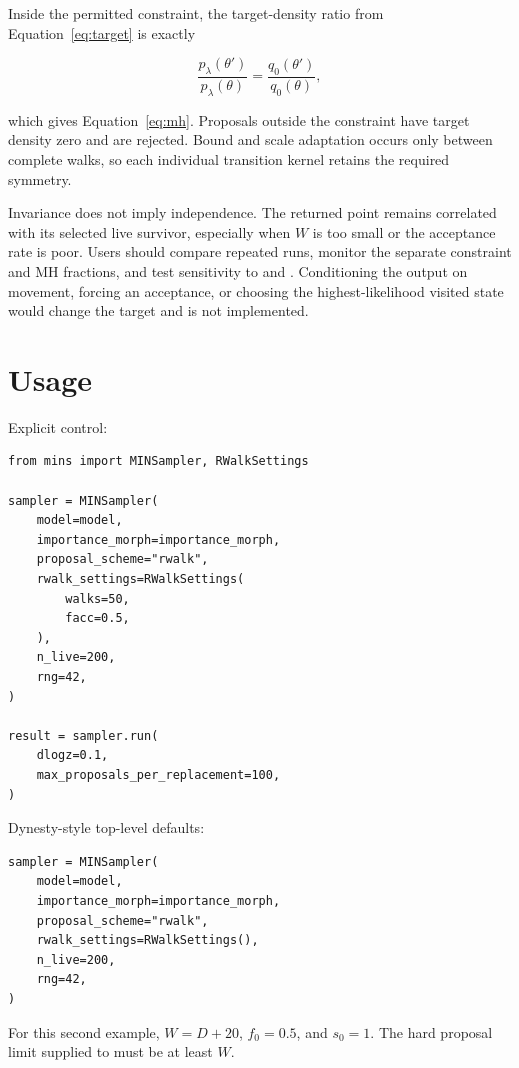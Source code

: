 \documentclass[11pt,a4paper]{article}
\newcommand{\code}[1]{\texttt{\detokenize{#1}}}
\begin{document}
Inside the permitted constraint, the target-density ratio from
Equation~\eqref{eq:target} is exactly

\begin{equation}
  \frac{p_\lambda(\theta')}{p_\lambda(\theta)}
  =\frac{q_0(\theta')}{q_0(\theta)},
\end{equation}

which gives Equation~\eqref{eq:mh}.  Proposals outside the constraint have
target density zero and are rejected.  Bound and scale adaptation occurs only
between complete walks, so each individual transition kernel retains the
required symmetry.

Invariance does not imply independence.  The returned point remains
correlated with its selected live survivor, especially when \(W\) is too
small or the acceptance rate is poor.  Users should compare repeated runs,
monitor the separate constraint and MH fractions, and test sensitivity to
\code{walks} and \code{n_live}.  Conditioning the output on movement, forcing
an acceptance, or choosing the highest-likelihood visited state would change
the target and is not implemented.

\section{Usage}

Explicit control:

\begin{lstlisting}
from mins import MINSampler, RWalkSettings

sampler = MINSampler(
    model=model,
    importance_morph=importance_morph,
    proposal_scheme="rwalk",
    rwalk_settings=RWalkSettings(
        walks=50,
        facc=0.5,
    ),
    n_live=200,
    rng=42,
)

result = sampler.run(
    dlogz=0.1,
    max_proposals_per_replacement=100,
)
\end{lstlisting}

Dynesty-style top-level defaults:

\begin{lstlisting}
sampler = MINSampler(
    model=model,
    importance_morph=importance_morph,
    proposal_scheme="rwalk",
    rwalk_settings=RWalkSettings(),
    n_live=200,
    rng=42,
)
\end{lstlisting}

For this second example, \(W=D+20\), \(f_0=0.5\), and \(s_0=1\).  The hard
proposal limit supplied to \code{run()} must be at least \(W\).
\end{document}

